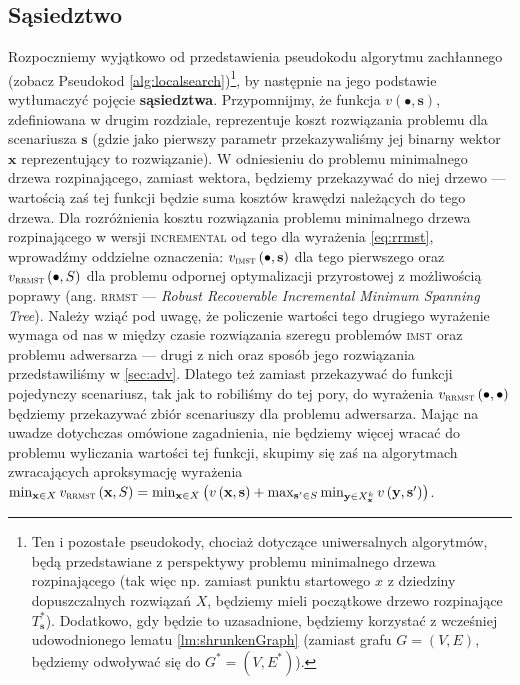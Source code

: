\subsection{Sąsiedztwo}

Rozpoczniemy wyjątkowo od przedstawienia pseudokodu algorytmu zachłannego (zobacz Pseudokod \ref{alg:localsearch})\footnote{Ten i pozostałe pseudokody, chociaż dotyczące uniwersalnych algorytmów, będą przedstawiane z perspektywy problemu minimalnego drzewa rozpinającego (tak więc np. zamiast punktu startowego $x$ z dziedziny dopuszczalnych rozwiązań $X$, będziemy mieli początkowe drzewo rozpinające $T^{\ast}_{\textbf{s}}$). Dodatkowo, gdy będzie to uzasadnione, będziemy korzystać z wcześniej udowodnionego lematu \ref{lm:shrunkenGraph} (zamiast grafu $G = \left( V, E \right)$, będziemy odwoływać się do $G^{\ast} = \left( V, E^{\ast} \right)$).}, by następnie na jego podstawie wytłumaczyć pojęcie \textbf{sąsiedztwa}. Przypomnijmy, że funkcja $v \left( \bullet, \textbf{s} \right)$, zdefiniowana w drugim rozdziale, reprezentuje koszt rozwiązania problemu dla scenariusza $\textbf{s}$ (gdzie jako pierwszy parametr przekazywaliśmy jej binarny wektor $\textbf{x}$ reprezentujący to rozwiązanie). W odniesieniu do problemu minimalnego drzewa rozpinającego, zamiast wektora, będziemy przekazywać do niej drzewo --- wartością zaś tej funkcji będzie suma kosztów krawędzi należących do tego drzewa. Dla rozróżnienia kosztu rozwiązania problemu minimalnego drzewa rozpinającego w wersji \textsc{incremental} od tego dla wyrażenia \ref{eq:rrmst}, wprowadźmy oddzielne oznaczenia: $v_{\textsc{imst}} \left( \bullet, \textbf{s} \right)$ dla tego pierwszego oraz $v_{\textsc{rrmst}} \left( \bullet, S \right)$ dla problemu odpornej optymalizacji przyrostowej z możliwością poprawy (ang. \textsc{rrmst} --- \textit{Robust Recoverable Incremental Minimum Spanning Tree}). Należy wziąć pod uwagę, że policzenie wartości tego drugiego wyrażenie wymaga od nas w między czasie rozwiązania szeregu problemów \textsc{imst} oraz problemu adwersarza --- drugi z nich oraz sposób jego rozwiązania przedstawiliśmy w \ref{sec:adv}. Dlatego też zamiast przekazywać do funkcji pojedynczy scenariusz, tak jak to robiliśmy do tej pory, do wyrażenia $v_{\textsc{rrmst}} \left( \bullet, \bullet \right)$ będziemy przekazywać zbiór scenariuszy dla problemu adwersarza. Mając na uwadze dotychczas omówione zagadnienia, nie będziemy więcej wracać do problemu wyliczania wartości tej funkcji, skupimy się zaś na algorytmach zwracających aproksymację wyrażenia $\min_{\textbf{x} \in X} v_{\textsc{rrmst}} \left( \textbf{x}, S \right) = \min_{\textbf{x} \in X} \left( v \left( \textbf{x}, \textbf{s} \right) + \max_{\textbf{s}^{\prime} \in S} \min_{\textbf{y} \in X^{k}_{\textbf{x}}} v \left( \textbf{y}, \textbf{s}^{\prime} \right) \right)$.
\vspace*{-8pt}

